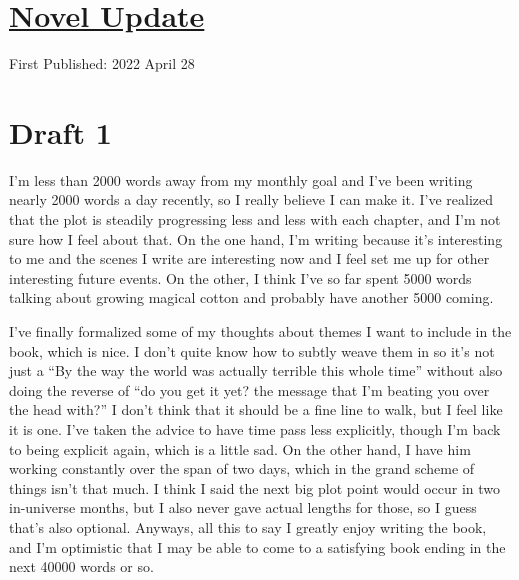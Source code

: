 \documentclass[12pt]{article}[titlepage]
\newcommand{\say}[1]{``#1''}
\newcommand{\1}{\={a}}
\newcommand{\2}{\={e}}
\newcommand{\3}{\={\i}}
\newcommand{\4}{\=o}
\newcommand{\5}{\=u}
\newcommand{\6}{\={A}}
\renewcommand{\,}{\textsuperscript{,}}
\begin{document}
\doublespacing
\section{\href{novel-update-6.html}{Novel Update}}
First Published: 2022 April 28


\section{Draft 1}
I'm less than 2000 words away from my monthly goal and I've been writing nearly 2000 words a day recently, so I really believe I can make it.
I've realized that the plot is steadily progressing less and less with each chapter, and I'm not sure how I feel about that.
On the one hand, I'm writing because it's interesting to me and the scenes I write are interesting now and I feel set me up for other interesting future events.
On the other, I think I've so far spent 5000 words talking about growing magical cotton and probably have another 5000 coming.

I've finally formalized some of my thoughts about themes I want to include in the book, which is nice.
I don't quite know how to subtly weave them in so it's not just a \say{By the way the world was actually terrible this whole time} without also doing the reverse of \say{do you get it yet? the message that I'm beating you over the head with?}
I don't think that it should be a fine line to walk, but I feel like it is one.
I've taken the advice to have time pass less explicitly, though I'm back to being explicit again, which is a little sad.
On the other hand, I have him working constantly over the span of two days, which in the grand scheme of things isn't that much.
I think I said the next big plot point would occur in two in-universe months, but I also never gave actual lengths for those, so I guess that's also optional.
Anyways, all this to say I greatly enjoy writing the book, and I'm optimistic that I may be able to come to a satisfying book ending in the next 40000 words or so.
\end{document}
